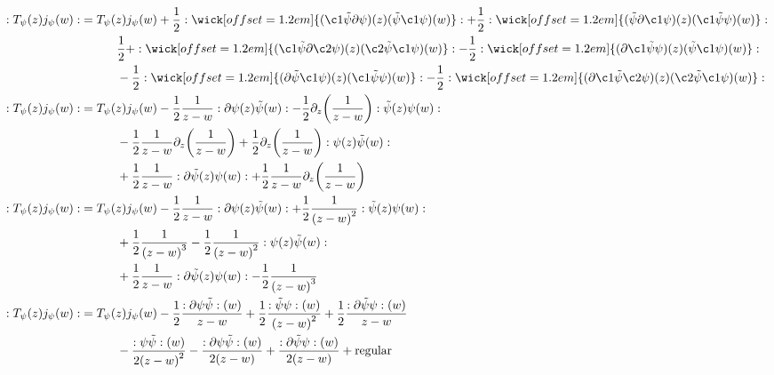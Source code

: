 \begin{align*}
    \cnord{T_\psi\qty(z)j_\psi\qty(w)}&=T_\psi\qty(z)j_\psi\qty(w)+\frac12\cnord{\wick[offset=1.2em]{(\c1{\tilde\psi}\partial\psi)\qty(z)(\tilde\psi\c1\psi)\qty(w)}}+\frac12\cnord{\wick[offset=1.2em]{(\tilde\psi\partial\c1\psi)\qty(z)(\c1{\tilde\psi}\psi)\qty(w)}}\\
    &\quad\quad\quad\frac12+\cnord{\wick[offset=1.2em]{(\c1{\tilde\psi}\partial\c2\psi)\qty(z)(\c2{\tilde\psi}\c1\psi)\qty(w)}}-\frac12\cnord{\wick[offset=1.2em]{(\partial\c1{\tilde\psi}\psi)\qty(z)(\tilde\psi\c1\psi)\qty(w)}}\\
    &\quad\quad\quad-\frac12\cnord{\wick[offset=1.2em]{(\partial{\tilde\psi}\c1\psi)\qty(z)(\c1{\tilde\psi}\psi)\qty(w)}}-\frac12\cnord{\wick[offset=1.2em]{(\partial\c1{\tilde\psi}\c2\psi)\qty(z)(\c2{\tilde\psi}\c1\psi)\qty(w)}}\\
    \cnord{T_\psi\qty(z)j_\psi\qty(w)}&=T_\psi\qty(z)j_\psi\qty(w)-\frac12\frac{1}{z-w}\cnord{\partial\psi\qty(z)\tilde\psi\qty(w)}-\frac12\partial_z\qty(\frac{1}{z-w})\cnord{\tilde\psi\qty(z)\psi\qty(w)}\\
    &\quad\quad\quad-\frac12\frac{1}{z-w}\partial_z\qty(\frac{1}{z-w})+\frac12\partial_z\qty(\frac{1}{z-w})\cnord{\psi\qty(z)\tilde\psi\qty(w)}\\
    &\quad\quad\quad+\frac12\frac{1}{z-w}\cnord{\partial{\tilde\psi}\qty(z)\psi\qty(w)}+\frac12\frac{1}{z-w}\partial_z\qty(\frac{1}{z-w})\\
    \cnord{T_\psi\qty(z)j_\psi\qty(w)}&=T_\psi\qty(z)j_\psi\qty(w)-\frac12\frac{1}{z-w}\cnord{\partial\psi\qty(z)\tilde\psi\qty(w)}+\frac12\frac{1}{\qty(z-w)^2}\cnord{\tilde\psi\qty(z)\psi\qty(w)}\\
    &\quad\quad\quad+\frac12\frac{1}{\qty(z-w)^3}-\frac12\frac{1}{\qty(z-w)^2}\cnord{\psi\qty(z)\tilde\psi\qty(w)}\\
    &\quad\quad\quad+\frac12\frac{1}{z-w}\cnord{\partial{\tilde\psi}\qty(z)\psi\qty(w)}-\frac12\frac{1}{\qty(z-w)^3}\\
    \cnord{T_\psi\qty(z)j_\psi\qty(w)}&=T_\psi\qty(z)j_\psi\qty(w)-\frac12\frac{\cnord{\partial\psi\tilde\psi}\qty(w)}{z-w}+\frac12\frac{\cnord{\tilde\psi\psi}\qty(w)}{\qty(z-w)^2}+\frac12\frac{\cnord{\partial\tilde\psi\psi}\qty(w)}{z-w}\\
    &\quad\quad\quad-\frac{\cnord{\psi\tilde\psi}\qty(w)}{2\qty(z-w)^2}-\frac{\cnord{\partial\psi\tilde\psi}\qty(w)}{2\qty(z-w)}+\frac{\cnord{\partial{\tilde\psi}\psi}\qty(w)}{2\qty(z-w)}+\textnormal{regular}\\

\end{align*}

